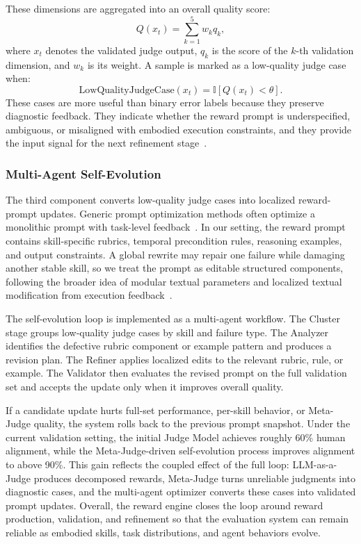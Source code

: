 These dimensions are aggregated into an overall quality score:
\begin{equation}
Q(x_t)=\sum_{k=1}^{5} w_k q_k,
\label{eq:meta_quality}
\end{equation}
where $x_t$ denotes the validated judge output, $q_k$ is the score of the $k$-th validation dimension, and $w_k$ is its weight. A sample is marked as a low-quality judge case when:
\begin{equation}
\mathrm{LowQualityJudgeCase}(x_t)=\mathbb{I}[Q(x_t)<\theta].
\label{eq:low_quality_case}
\end{equation}
These cases are more useful than binary error labels because they preserve diagnostic feedback. They indicate whether the reward prompt is underspecified, ambiguous, or misaligned with embodied execution constraints, and they provide the input signal for the next refinement stage~\citep{wang2026outcome,li2025multiagent}.

\subsubsection{Multi-Agent Self-Evolution}
\label{subsec:structured_reward_optimization}

The third component converts low-quality judge cases into localized reward-prompt updates. Generic prompt optimization methods often optimize a monolithic prompt with task-level feedback~\citep{yang2024opro,khattab2023dspy}. In our setting, the reward prompt contains skill-specific rubrics, temporal precondition rules, reasoning examples, and output constraints. A global rewrite may repair one failure while damaging another stable skill, so we treat the prompt as editable structured components, following the broader idea of modular textual parameters and localized textual modification from execution feedback~\citep{he2026learning}.

The self-evolution loop is implemented as a multi-agent workflow. The Cluster stage groups low-quality judge cases by skill and failure type. The Analyzer identifies the defective rubric component or example pattern and produces a revision plan. The Refiner applies localized edits to the relevant rubric, rule, or example. The Validator then evaluates the revised prompt on the full validation set and accepts the update only when it improves overall quality.

If a candidate update hurts full-set performance, per-skill behavior, or Meta-Judge quality, the system rolls back to the previous prompt snapshot. Under the current validation setting, the initial Judge Model achieves roughly 60\% human alignment, while the Meta-Judge-driven self-evolution process improves alignment to above 90\%. This gain reflects the coupled effect of the full loop: LLM-as-a-Judge produces decomposed rewards, Meta-Judge turns unreliable judgments into diagnostic cases, and the multi-agent optimizer converts these cases into validated prompt updates. Overall, the reward engine closes the loop around reward production, validation, and refinement so that the evaluation system can remain reliable as embodied skills, task distributions, and agent behaviors evolve.
